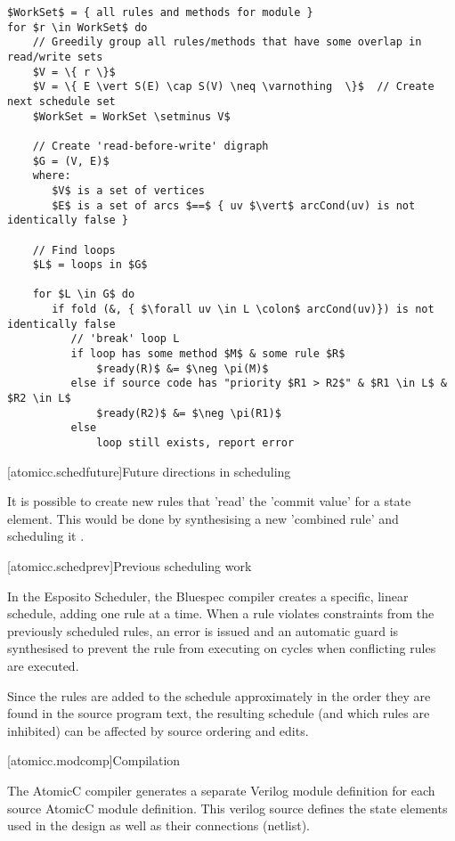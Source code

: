 \begin{lstlisting}[mathescape=true]
$WorkSet$ = { all rules and methods for module }
for $r \in WorkSet$ do
    // Greedily group all rules/methods that have some overlap in read/write sets
    $V = \{ r \}$
    $V = \{ E \vert S(E) \cap S(V) \neq \varnothing  \}$  // Create next schedule set
    $WorkSet = WorkSet \setminus V$

    // Create 'read-before-write' digraph
    $G = (V, E)$
    where: 
       $V$ is a set of vertices
       $E$ is a set of arcs $==$ { uv $\vert$ arcCond(uv) is not identically false }

    // Find loops
    $L$ = loops in $G$

    for $L \in G$ do
       if fold (&, { $\forall uv \in L \colon$ arcCond(uv)}) is not identically false
          // 'break' loop L
          if loop has some method $M$ & some rule $R$
              $ready(R)$ &= $\neg \pi(M)$
          else if source code has "priority $R1 > R2$" & $R1 \in L$ & $R2 \in L$
              $ready(R2)$ &= $\neg \pi(R1)$
          else
              loop still exists, report error
\end{lstlisting}

[atomicc.schedfuture]{Future directions in scheduling}

It is possible to create new rules that 'read' the 'commit value' for a state element.
This would be done by synthesising a new 'combined rule' and scheduling it \cite{Rosenband:Thesis}.

[atomicc.schedprev]{Previous scheduling work}

In the Esposito Scheduler\cite{Esposito:Patent},
the Bluespec compiler creates a specific, linear schedule, adding
one rule at a time.  When a rule violates constraints from the previously scheduled
rules, an error is issued and an automatic guard is synthesised to prevent the
rule from executing on cycles when conflicting rules are executed.

Since the rules are added to the schedule approximately in the order they are
found in the source program text, the resulting schedule (and which rules are
inhibited) can be affected by source ordering and edits.

[atomicc.modcomp]{Compilation}

The AtomicC compiler generates a separate Verilog module definition
for each source AtomicC module definition.
This verilog source defines the state elements
used in the design as well as their connections (netlist).

